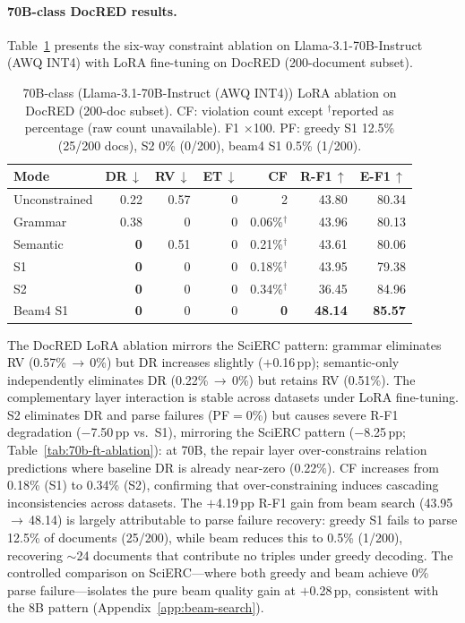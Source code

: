 \paragraph{70B-class DocRED results.}
\label{app:70b-docred}

Table~\ref{tab:70b-docred-ablation} presents the six-way constraint ablation on Llama-3.1-70B-Instruct (AWQ INT4) with LoRA fine-tuning on DocRED (200-document subset).

\begin{table}[h]
\centering
\small
\setlength{\tabcolsep}{3.6pt}
\begin{tabular}{@{}l rrrr rr@{}}
\toprule
\textbf{Mode}
  & \textbf{DR\,$\downarrow$} & \textbf{RV\,$\downarrow$} & \textbf{ET\,$\downarrow$} & \textbf{CF}
  & \textbf{R-F1\,$\uparrow$} & \textbf{E-F1\,$\uparrow$} \\
\midrule
Unconstrained & 0.22 & 0.57 & 0 & 2      & 43.80 & 80.34 \\
Grammar       & 0.38 & 0    & 0 & 0.06\%$^\dagger$ & 43.96 & 80.13 \\
Semantic      & \textbf{0} & 0.51 & 0 & 0.21\%$^\dagger$ & 43.61 & 80.06 \\
S1            & \textbf{0} & 0 & 0 & 0.18\%$^\dagger$ & 43.95 & 79.38 \\
S2            & \textbf{0} & 0 & 0 & 0.34\%$^\dagger$ & 36.45 & 84.96 \\
Beam4 S1      & \textbf{0} & 0 & 0 & \textbf{0} & \textbf{48.14} & \textbf{85.57} \\
\bottomrule
\end{tabular}
\caption{70B-class (Llama-3.1-70B-Instruct (AWQ INT4)) LoRA ablation on DocRED (200-doc subset).
CF: violation count except $^\dagger$reported as percentage (raw count unavailable).
F1 $\times$100.
PF: greedy S1 12.5\% (25/200 docs), S2 0\% (0/200), beam4 S1 0.5\% (1/200).}
\label{tab:70b-docred-ablation}
\end{table}

The DocRED LoRA ablation mirrors the SciERC pattern: grammar eliminates RV (0.57\%\,$\to$\,0\%) but DR increases slightly ($+$0.16\,pp); semantic-only independently eliminates DR (0.22\%\,$\to$\,0\%) but retains RV (0.51\%).
The complementary layer interaction is stable across datasets under LoRA fine-tuning.
S2 eliminates DR and parse failures (PF${=}$0\%) but causes severe R-F1 degradation ($-$7.50\,pp vs.\ S1), mirroring the SciERC pattern ($-$8.25\,pp; Table~\ref{tab:70b-ft-ablation}): at 70B, the repair layer over-constrains relation predictions where baseline DR is already near-zero (0.22\%).
CF increases from 0.18\% (S1) to 0.34\% (S2), confirming that over-constraining induces cascading inconsistencies across datasets.
The $+$4.19\,pp R-F1 gain from beam search (43.95\,$\to$\,48.14) is largely attributable to parse failure recovery: greedy S1 fails to parse 12.5\% of documents (25/200), while beam reduces this to 0.5\% (1/200), recovering $\sim$24 documents that contribute no triples under greedy decoding.
The controlled comparison on SciERC---where both greedy and beam achieve 0\% parse failure---isolates the pure beam quality gain at $+$0.28\,pp, consistent with the 8B pattern (Appendix~\ref{app:beam-search}).


